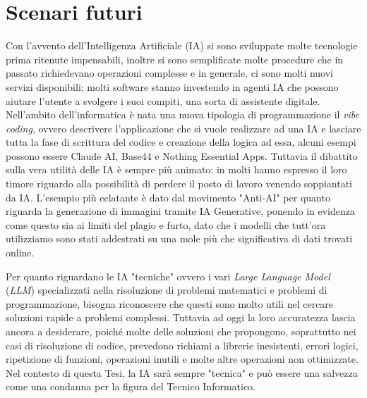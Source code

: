 \setcounter{chapter}{4}
\setcounter{section}{0}

\chapter{Scenari futuri}
        Con l'avvento dell'Intelligenza Artificiale (IA) si sono sviluppate molte tecnologie prima ritenute impensabili, inoltre si sono semplificate molte procedure che in passato richiedevano operazioni complesse e in generale, ci sono molti nuovi servizi disponibili; molti software stanno investendo in agenti IA che possono aiutare l'utente a svolgere i suoi compiti, una sorta di assistente digitale. Nell'ambito dell'informatica è nata una nuova tipologia di programmazione il \textit{vibe coding}, ovvero descrivere l'applicazione che si vuole realizzare ad una IA e lasciare tutta la fase di scrittura del codice e creazione della logica ad essa, alcuni esempi possono essere Claude AI, Base44 e Nothing Essential Apps. Tuttavia il dibattito sulla vera utilità delle IA è sempre più animato: in molti hanno espresso il loro timore riguardo alla possibilità di perdere il posto di lavoro venendo soppiantati da IA. L'esempio più eclatante è dato dal movimento "Anti-AI" per quanto riguarda la generazione di immagini tramite IA Generative, ponendo in evidenza come questo sia ai limiti del plagio e furto, dato che i modelli che tutt'ora utilizziamo sono stati addestrati su una mole più che significativa di dati trovati online. 
    \par
        Per quanto riguardano le IA "tecniche" ovvero i vari \textit{Large Language Model} (\textit{LLM}) specializzati nella risoluzione di problemi matematici e problemi di programmazione, bisogna riconoscere che questi sono molto utili nel cercare soluzioni rapide a problemi complessi. Tuttavia ad oggi la loro accuratezza lascia ancora a desiderare, poiché molte delle soluzioni che propongono, soprattutto nei casi di risoluzione di codice, prevedono richiami a librerie inesistenti, errori logici, ripetizione di funzioni, operazioni inutili e molte altre operazioni non ottimizzate. \newline 
        Nel contesto di questa Tesi, la IA sarà sempre "tecnica" e può essere una salvezza come una condanna per la figura del Tecnico Informatico. 
        
